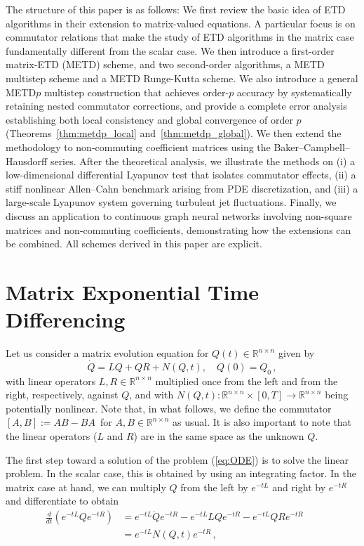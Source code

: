 \documentclass[12pt]{article}
\begin{document}
The structure of this paper is as follows: We first review the basic idea of ETD algorithms in their extension to matrix-valued equations. A particular focus is on commutator relations that make the study of ETD algorithms in the matrix case fundamentally different from the scalar case. We then introduce a first-order matrix-ETD (METD) scheme, and two second-order algorithms, a METD multistep scheme and a METD Runge-Kutta scheme. We also introduce a general METD$p$ multistep construction that achieves order-$p$ accuracy by systematically retaining nested commutator corrections, and provide a complete error analysis establishing both local consistency and global convergence of order $p$ (Theorems~\ref{thm:metdp_local} and~\ref{thm:metdp_global}). We then extend the methodology to non-commuting coefficient matrices using the Baker--Campbell--Hausdorff series. After the theoretical analysis, we illustrate the methods on (i) a low-dimensional differential Lyapunov test that isolates commutator effects, (ii) a stiff nonlinear Allen–Cahn benchmark arising from PDE discretization, and (iii) a large-scale Lyapunov system governing turbulent jet fluctuations. Finally, we discuss an application to continuous graph neural networks involving non-square matrices and non-commuting coefficients, demonstrating how the extensions can be combined. All schemes derived in this paper are explicit.

\section{Matrix Exponential Time Differencing}

Let us consider a matrix evolution equation for $Q(t) \in \mathbb{R}^{n \times n}$ given by 
\begin{equation}
    \label{eq:ODE}
    \dot Q = LQ + QR + N(Q,t),\quad Q(0) = Q_0\,,
\end{equation}
with linear operators $L, R \in \mathbb{R}^{n \times n}$ multiplied once from the left and from the right, respectively, against $Q$, and with $N(Q,t): \mathbb{R}^{n\times n}\times [0,T]\to  \mathbb{R}^{n \times n}$ being potentially nonlinear. Note that, in what follows, we define the commutator $[A,B] := AB - BA\,$ for $A,B \in \mathbb{R}^{n \times n}$ as usual. It is also important to note that the linear operators ($L$ and $R$) are in the same space as the unknown $Q$.

The first step toward a solution of the problem (\ref{eq:ODE}) is to solve the linear problem. In the scalar case, this is obtained by using an integrating factor. In the matrix case at hand, we can multiply $Q$ from the left by $e^{-tL}$ and right by $e^{-tR}$ and differentiate 
to obtain
%
\begin{align*}
  \frac{d}{dt}\left(e^{-tL} Q e^{-tR} \right) 
  &= e^{-tL} \dot Q e^{-tR} - e^{-tL}  LQ e^{-tR} - e^{-tL} QR e^{-tR}\\
  &= e^{-tL} N(Q,t) e^{-tR} \,, &&
\end{align*}
\end{document}
